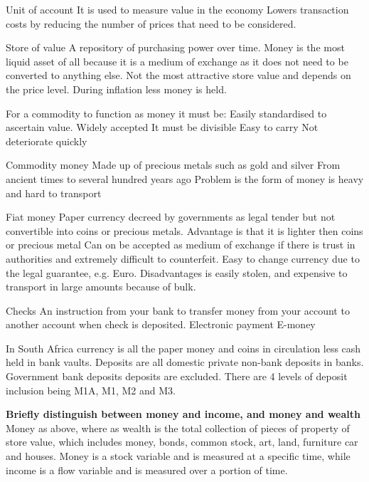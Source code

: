 \documentclass[12pt]{examnotes}
\begin{document}
 Unit of account 
\rna It is used to measure value in the economy
\rna Lowers transaction costs by reducing the number of prices that need to be considered.

 Store of value
\rna A repository of purchasing power over time.
\rna Money is the most liquid asset of all because it is a medium of exchange as it does not need to be converted to anything else.
\rna Not the most attractive store value and depends on the price level.
\rna During inflation less money is held.

\vspace{6pt}
\ra For a commodity to function as money it must be:
 Easily standardised to ascertain value.
 Widely accepted
 It must be divisible
 Easy to carry
 Not deteriorate quickly

 Commodity money
\rna Made up of precious metals such as gold and silver
\rna From ancient times to several hundred years ago
\rna Problem is the form of money is heavy and hard to transport
 
 Fiat money
\rna Paper currency decreed by governments as legal tender but not convertible into coins or precious metals.
\rna Advantage is that it is lighter then coins or precious metal
\rna  Can on be accepted as medium of exchange if there is trust in authorities and extremely difficult to counterfeit.
\rna Easy to change currency due to the legal guarantee, e.g. Euro.
\rna Disadvantages is easily stolen, and expensive to transport in large amounts because of bulk.

 Checks
\rna An instruction from your bank to transfer money from your account to another account when check is deposited.
\rna 
{} Electronic payment
\rna 
\rna 
{} E-money


\ra  In South Africa currency is all the paper money and coins in circulation less cash held in bank vaults. 
\ra Deposits are all domestic private non-bank deposits in banks. 
\ra Government bank deposits deposits are excluded. There are 4 levels of deposit inclusion being M1A, M1, M2 and M3.

\textbf{Briefly distinguish between money and income, and money and wealth}
Money as above, where as wealth is the total collection of pieces of property of store value, which includes money, bonds, common stock, art, land, furniture car and houses. Money is a stock variable and is measured at a specific time, while income is a flow variable and is measured over a portion of time.
\end{document}

